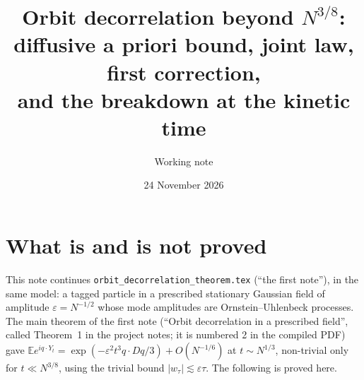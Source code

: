 \documentclass[11pt]{article}
\title{Orbit decorrelation beyond $N^{3/8}$:\\
diffusive a priori bound, joint law, first correction,\\
and the breakdown at the kinetic time}
\author{Working note}
\date{24 November 2026}
\newcommand{\E}{\mathbb{E}}
\newcommand{\eps}{\varepsilon}
\theoremstyle{remark}
\begin{document}
\maketitle

\section{What is and is not proved}

This note continues \texttt{orbit\_decorrelation\_theorem.tex} (``the first
note''), in the same model: a tagged particle in a prescribed stationary
Gaussian field of amplitude $\eps = N^{-1/2}$ whose mode amplitudes are
Ornstein--Uhlenbeck processes. The main theorem of the first note (``Orbit
decorrelation in a prescribed field'', called Theorem~1 in the project notes;
it is numbered 2 in the compiled PDF) gave
$\E e^{iq\cdot Y_t} = \exp(-\eps^2t^3q\cdot Dq/3) + O(N^{-1/6})$ at
$t\sim N^{1/3}$, non-trivial only for $t\ll N^{3/8}$, using the trivial bound
$|w_\tau|\lesssim\eps\tau$. The following is proved here.
\end{document}
